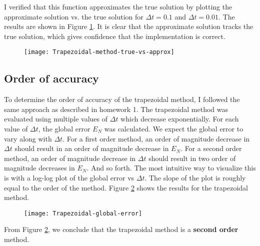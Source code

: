 \documentclass{article}
\begin{document}
I verified that this function approximates the true solution by plotting the approximate solution vs. the true solution for \(\Delta t = 0.1\) and \(\Delta t = 0.01\).  The results are shown in Figure \ref{fig:trapezoidal-approx}.  It is clear that the approximate solution tracks the true solution, which gives confidence that the implementation is correct.
\begin{figure}[H]
	\centering
	\texttt{[image: Trapezoidal-method-true-vs-approx]}
	\caption{}
	\label{fig:trapezoidal-approx}
\end{figure}
\subsection{Order of accuracy} \label{section:trapezoidal-accuracy}
To determine the order of accuracy of the trapezoidal method, I followed the same approach as described in homework 1. The trapezoidal method was evaluated using multiple values of $\Delta t$ which decrease exponentially.  For each value of $\Delta t$, the global error $E_N$ was calculated.  We expect the global error to vary along with $\Delta t$.  For a first order method, an order of magnitude decrease in $\Delta t$ should result in an order of magnitude decrease in $E_N$.  For a second order method, an order of magnitude decrease in $\Delta t$ should result in two order of magnitude decreases in $E_N$.  And so forth.  The most intuitive way to visualize this is with a log-log plot of the global error vs $\Delta t$.  The slope of the plot is roughly equal to the order of the method.  Figure \ref{fig:trapezoidal-global-error} shows the results for the trapezoidal method.
\begin{figure}[H]
	\centering
	\texttt{[image: Trapezoidal-global-error]}
	\caption{}
	\label{fig:trapezoidal-global-error}
\end{figure}
From Figure \ref{fig:trapezoidal-global-error}, we conclude that the trapezoidal method is a \textbf{second order} method.
\end{document}
